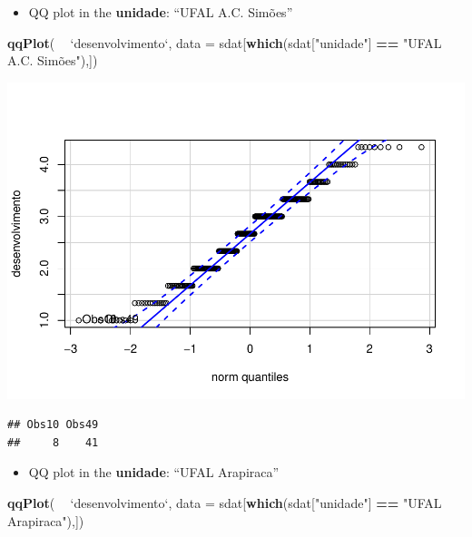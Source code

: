 \documentclass[]{article}
\newenvironment{Shaded}{\begin{snugshade}}{\end{snugshade}}
\newcommand{\DataTypeTok}[1]{\textcolor[rgb]{0.13,0.29,0.53}{#1}}
\newcommand{\KeywordTok}[1]{\textcolor[rgb]{0.13,0.29,0.53}{\textbf{#1}}}
\newcommand{\NormalTok}[1]{#1}
\newcommand{\OperatorTok}[1]{\textcolor[rgb]{0.81,0.36,0.00}{\textbf{#1}}}
\newcommand{\StringTok}[1]{\textcolor[rgb]{0.31,0.60,0.02}{#1}}
\providecommand{\tightlist}{%
  \setlength{\itemsep}{0pt}\setlength{\parskip}{0pt}}
\begin{document}
\begin{itemize}
\tightlist
\item
  QQ plot in the \textbf{unidade}: ``UFAL A.C. Simões''
\end{itemize}

\begin{Shaded}
\begin{Highlighting}[]
\KeywordTok{qqPlot}\NormalTok{( }\OperatorTok{~}\StringTok{ `}\DataTypeTok{desenvolvimento}\StringTok{`}\NormalTok{, }\DataTypeTok{data =}\NormalTok{ sdat[}\KeywordTok{which}\NormalTok{(sdat[}\StringTok{"unidade"}\NormalTok{] }\OperatorTok{==}\StringTok{ "UFAL A.C. Simões"),])}
\end{Highlighting}
\end{Shaded}

\includegraphics{factorialAnova_files/figure-latex/unnamed-chunk-17-1.pdf}

\begin{verbatim}
## Obs10 Obs49 
##     8    41
\end{verbatim}

\begin{itemize}
\tightlist
\item
  QQ plot in the \textbf{unidade}: ``UFAL Arapiraca''
\end{itemize}

\begin{Shaded}
\begin{Highlighting}[]
\KeywordTok{qqPlot}\NormalTok{( }\OperatorTok{~}\StringTok{ `}\DataTypeTok{desenvolvimento}\StringTok{`}\NormalTok{, }\DataTypeTok{data =}\NormalTok{ sdat[}\KeywordTok{which}\NormalTok{(sdat[}\StringTok{"unidade"}\NormalTok{] }\OperatorTok{==}\StringTok{ "UFAL Arapiraca"}\NormalTok{),])}
\end{Highlighting}
\end{Shaded}
\end{document}
